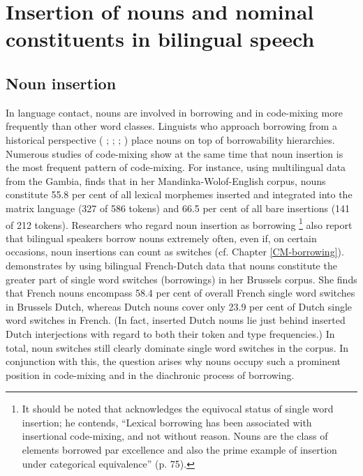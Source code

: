 \section{Insertion of nouns and nominal constituents in bilingual speech}
\subsection{Noun insertion}\label{noun-insertion}
In language contact, nouns are involved in borrowing and in code-mixing more frequently than other word classes. Linguists who approach borrowing from a historical perspective ( \citealt{whitney-1881}; \citealt{moravcsik}; \citealt{thomason-kaufman}; \citealt{matras2009}) place nouns on top of borrowability hierarchies. Numerous studies of code-mixing show at the same time that noun insertion is the most frequent pattern of code-mixing. For instance, using multilingual data from the Gambia, \citet[112, 107]{haust-codeswitching-1995} finds that in her Mandinka-Wolof-English corpus, nouns constitute 55.8 per cent of all lexical morphemes inserted and integrated into the matrix language (327 of 586 tokens) and 66.5 per cent of all bare insertions (141 of 212 tokens). Researchers who regard noun insertion as borrowing \citep{poplack-etal-1988, sankoff-et-al-1990, van-hout-muysken, muysken-bilingual-2000}\footnote{
It should be noted that \citet{muysken-bilingual-2000} acknowledges the equivocal status of single word insertion; he contends, ``Lexical borrowing has been associated with insertional code-mixing, and not without reason. Nouns are the class of elements borrowed par excellence and also the prime example of insertion under categorical equivalence'' (p. 75).} 
also report that bilingual speakers borrow nouns extremely often, even if, on certain occasions, noun insertions can count as switches (cf. Chapter \ref{CM-borrowing}). \citet[99--100]{treffers-daller-mixing-1994} demonstrates by using bilingual French-Dutch data that nouns constitute the greater part of single word switches (borrowings) in her Brussels corpus. She finds that French nouns encompass 58.4 per cent of overall French single word switches in Brussels Dutch, whereas Dutch nouns cover only 23.9 per cent of Dutch single word switches in French. (In fact, inserted Dutch nouns lie just behind inserted Dutch interjections with regard to both their token and type frequencies.) In total, noun switches still clearly dominate single word switches in the corpus. In conjunction with this, the question arises why nouns occupy such a prominent position in code-mixing and in the diachronic process of borrowing. 

